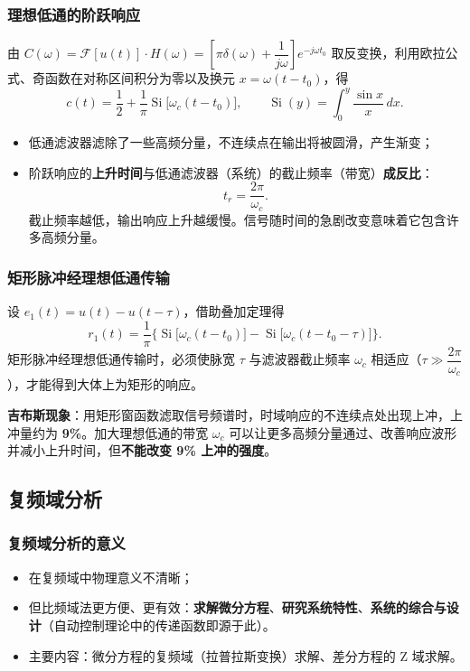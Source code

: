 \subsubsection{理想低通的阶跃响应}
由 $C(\omega)=\mathcal{F}[u(t)]\cdot H(\omega)=\left[\pi\delta(\omega)+\dfrac{1}{j\omega}\right]e^{-j\omega t_0}$ 取反变换，利用欧拉公式、奇函数在对称区间积分为零以及换元 $x=\omega(t-t_0)$，得
\begin{equation}
c(t)=\frac{1}{2}+\frac{1}{\pi}\operatorname{Si}\big[\omega_c(t-t_0)\big],\qquad
\operatorname{Si}(y)=\int_{0}^{y}\frac{\sin x}{x}\,dx .
\end{equation}
\begin{itemize}
\item 低通滤波器滤除了一些高频分量，不连续点在输出将被圆滑，产生渐变；
\item 阶跃响应的\textbf{上升时间}与低通滤波器（系统）的截止频率（带宽）\textbf{成反比}：
\begin{equation}
t_r=\frac{2\pi}{\omega_c}.
\end{equation}
截止频率越低，输出响应上升越缓慢。信号随时间的急剧改变意味着它包含许多高频分量。
\end{itemize}

\subsubsection{矩形脉冲经理想低通传输}
设 $e_1(t)=u(t)-u(t-\tau)$，借助叠加定理得
\begin{equation}
r_1(t)=\frac{1}{\pi}\Big\{\operatorname{Si}\big[\omega_c(t-t_0)\big]-\operatorname{Si}\big[\omega_c(t-t_0-\tau)\big]\Big\}.
\end{equation}
矩形脉冲经理想低通传输时，必须使脉宽 $\tau$ 与滤波器截止频率 $\omega_c$ 相适应（$\tau\gg\dfrac{2\pi}{\omega_c}$），才能得到大体上为矩形的响应。

\textbf{吉布斯现象}：用矩形窗函数滤取信号频谱时，时域响应的不连续点处出现上冲，上冲量约为 \textbf{9\%}。加大理想低通的带宽 $\omega_c$ 可以让更多高频分量通过、改善响应波形并减小上升时间，但\textbf{不能改变 9\% 上冲的强度}。

\subsection{复频域分析}

\subsubsection{复频域分析的意义}
\begin{itemize}
\item 在复频域中物理意义不清晰；
\item 但比频域法更方便、更有效：\textbf{求解微分方程}、\textbf{研究系统特性}、\textbf{系统的综合与设计}（自动控制理论中的传递函数即源于此）。
\item 主要内容：微分方程的复频域（拉普拉斯变换）求解、差分方程的 Z 域求解。
\end{itemize}

